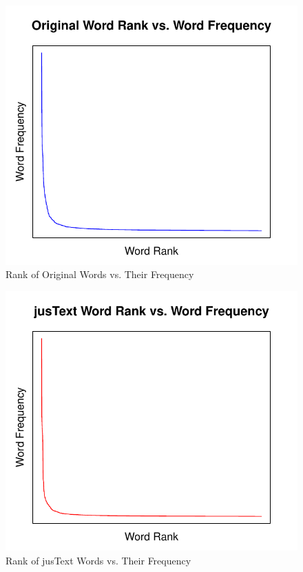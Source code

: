 \documentclass[a4paper,12pt]{article}
\begin{document}
\begin{figure}[H]
    \centering
    \includegraphics{stats/original_words.pdf}
    \caption{Rank of Original Words vs. Their Frequency}
\end{figure}
\begin{figure}[H]
    \centering
    \includegraphics{stats/boilerpipe_words.pdf}
    \caption{Rank of jusText Words vs. Their Frequency}
\end{figure}





\end{document}
